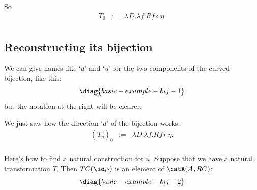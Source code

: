 \documentclass[oneside,12pt]{article}
\begin{document}
So
%
$$\begin{array}{rcl}
    T_0 &:=& λD.λf.Rf∘η. \\
  \end{array}
$$


%
\subsection{Reconstructing its bijection \DONE}
\label{basic-example-bij}

We can give names like `$d$' and `$u$' for the two components of the
curved bijection, like this:
%
$$\pu
  \diag{basic-example-bij-1}
$$
%
but the notation at the right will be clearer.

We just saw how the direction `$d$' of the bijection works:
%
$$\begin{array}{rcl}
    (T_η)_0 &:=& λD.λf.Rf∘η. \\
  \end{array}
$$

Here's how to find a natural construction for $u$. Suppose that we
have a natural transformation $T$. Then $TC(\id_C)$ is an element of
$\catA(A,RC)$:
%
$$\pu
  \diag{basic-example-bij-2}
$$
\end{document}
